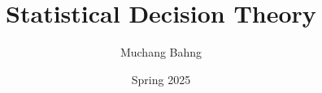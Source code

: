 \documentclass{article}
\begin{document}
\title{Statistical Decision Theory}
\author{Muchang Bahng}
\date{Spring 2025}

\maketitle
\tableofcontents
\pagebreak






\end{document}
